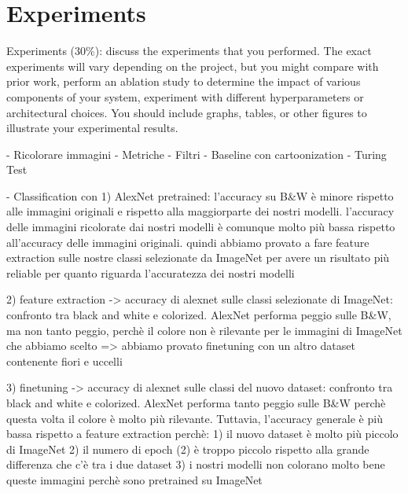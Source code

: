 \section{Experiments}
Experiments (30\%): discuss the experiments that you performed. The exact experiments will vary
depending on the project, but you might compare with prior work, perform an ablation study to
determine the impact of various components of your system, experiment with different hyperparameters
or architectural choices. You should include graphs, tables, or other figures to illustrate your experimental results.

- Ricolorare immagini
- Metriche
- Filtri
- Baseline con cartoonization
- Turing Test

- Classification con
1) AlexNet pretrained: l'accuracy su B&W è minore rispetto alle immagini originali e rispetto alla maggiorparte
dei nostri modelli. l'accuracy delle immagini ricolorate dai nostri modelli è comunque molto più bassa rispetto
all'accuracy delle immagini originali. quindi abbiamo provato a fare feature extraction sulle nostre classi
selezionate da ImageNet per avere un risultato più reliable per quanto riguarda l'accuratezza dei nostri modelli

2) feature extraction -> accuracy di alexnet sulle classi selezionate di ImageNet: confronto tra
black and white e colorized. AlexNet performa peggio sulle B&W, ma non tanto peggio, perchè il colore non è
rilevante per le immagini di ImageNet che abbiamo scelto => abbiamo provato finetuning con un altro dataset
contenente fiori e uccelli

3) finetuning -> accuracy di alexnet sulle classi del nuovo dataset: confronto tra black and white e colorized.
AlexNet performa tanto peggio sulle B&W perchè questa volta il colore è molto più rilevante. Tuttavia, l'accuracy
generale è più bassa rispetto a feature extraction perchè:
1) il nuovo dataset è molto più piccolo di ImageNet
2) il numero di epoch (2) è troppo piccolo rispetto alla grande differenza che c'è tra i due dataset
3) i nostri modelli non colorano molto bene queste immagini perchè sono pretrained su ImageNet



